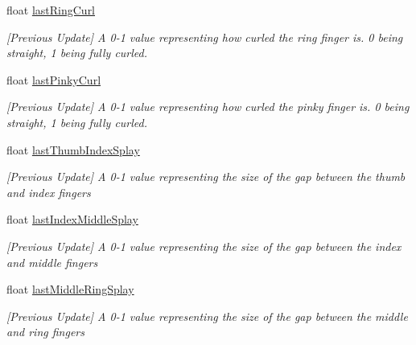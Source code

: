 \begin{DoxyCompactItemize}
float \mbox{\hyperlink{interface_valve_1_1_v_r_1_1_i_steam_v_r___action___skeleton___source_a7af26d481db15b493e1ab4180119e92c}{last\+Ring\+Curl}}
\begin{DoxyCompactList}\small\item\em \mbox{[}Previous Update\mbox{]} A 0-\/1 value representing how curled the ring finger is. 0 being straight, 1 being fully curled. \end{DoxyCompactList}\item 
float \mbox{\hyperlink{interface_valve_1_1_v_r_1_1_i_steam_v_r___action___skeleton___source_a7e67ea0a668307684b891c6cdfbc23d6}{last\+Pinky\+Curl}}
\begin{DoxyCompactList}\small\item\em \mbox{[}Previous Update\mbox{]} A 0-\/1 value representing how curled the pinky finger is. 0 being straight, 1 being fully curled. \end{DoxyCompactList}\item 
float \mbox{\hyperlink{interface_valve_1_1_v_r_1_1_i_steam_v_r___action___skeleton___source_a780dafd4acd62b8cb84cce5593bb09de}{last\+Thumb\+Index\+Splay}}
\begin{DoxyCompactList}\small\item\em \mbox{[}Previous Update\mbox{]} A 0-\/1 value representing the size of the gap between the thumb and index fingers \end{DoxyCompactList}\item 
float \mbox{\hyperlink{interface_valve_1_1_v_r_1_1_i_steam_v_r___action___skeleton___source_a5caec5585283ae9a0232ba0efe7b8e10}{last\+Index\+Middle\+Splay}}
\begin{DoxyCompactList}\small\item\em \mbox{[}Previous Update\mbox{]} A 0-\/1 value representing the size of the gap between the index and middle fingers \end{DoxyCompactList}\item 
float \mbox{\hyperlink{interface_valve_1_1_v_r_1_1_i_steam_v_r___action___skeleton___source_a62a9fe5c572c15f96407207ab8e9860c}{last\+Middle\+Ring\+Splay}}
\begin{DoxyCompactList}\small\item\em \mbox{[}Previous Update\mbox{]} A 0-\/1 value representing the size of the gap between the middle and ring fingers \end{DoxyCompactList}\item 

\end{DoxyCompactItemize}
